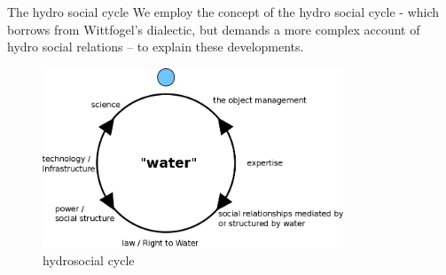 \documentclass[newPxFont]{beamer}
\begin{document}

\begin{frame}[c]{The hydro social cycle}
	\vspace{-2em}
	We employ the concept of the hydro social cycle  - which borrows from Wittfogel's dialectic, but demands a more complex account of hydro social relations -- to explain these developments.
	\begin{figure}
	\vspace{-1em}
	\centering
	\includegraphics[width = 0.8\textwidth]{img/hydrosocial_cycle}
	 \caption{hydrosocial cycle}
\end{figure}
	
\end{frame}

%
%
%
\end{document}
